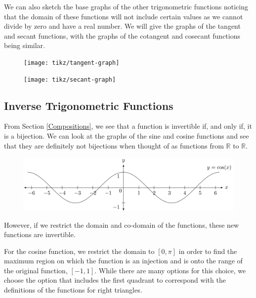 \documentclass[
]{book}
\theoremstyle{definition}
\theoremstyle{definition}
\theoremstyle{definition}
\theoremstyle{definition}
\theoremstyle{remark}
\begin{document}
We can also sketch the base graphs of the other trigonometric functions noticing that the domain of these functions will not include certain values as we cannot divide by zero and have a real number. We will give the graphs of the tangent and secant functions, with the graphs of the cotangent and cosecant functions being similar.

\begin{figure}

{\centering \texttt{[image: tikz/tangent-graph]} 

}

\end{figure}

\begin{figure}

{\centering \texttt{[image: tikz/secant-graph]} 

}

\end{figure}

\hypertarget{inverse-trigonometric-functions}{%
\subsection{Inverse Trigonometric Functions}\label{inverse-trigonometric-functions}}

From Section \ref{Compositions}, we see that a function is invertible if, and only if, it is a bijection. We can look at the graphs of the sine and cosine functions and see that they are definitely not bijections when thought of as functions from \(\mathbb{R}\) to \(\mathbb{R}\).

\begin{figure}

{\centering \includegraphics[width=1\linewidth]{tikz/cosine-graph} 

}

\end{figure}

However, if we restrict the domain and co-domain of the functions, these new functions are invertible.

For the cosine function, we restrict the domain to \([0,\pi]\) in order to find the maximum region on which the function is an injection and is onto the range of the original function, \([-1,1]\). While there are many options for this choice, we choose the option that includes the first quadrant to correspond with the definitions of the functions for right triangles.
\end{document}
